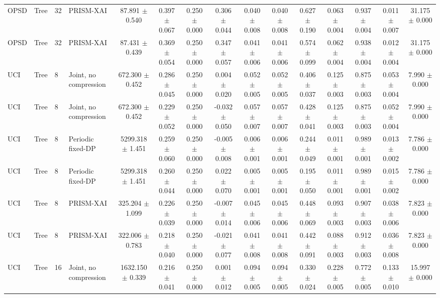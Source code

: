 \begin{table}[t]
\begin{tabular}{llllccccccccccc}
OPSD & Tree & 32 & PRISM-XAI & 87.891 $\pm$ 0.540 & 0.397 $\pm$ 0.067 & 0.250 $\pm$ 0.000 & 0.306 $\pm$ 0.044 & 0.040 $\pm$ 0.008 & 0.040 $\pm$ 0.008 & 0.627 $\pm$ 0.190 & 0.063 $\pm$ 0.004 & 0.937 $\pm$ 0.004 & 0.011 $\pm$ 0.007 & 31.175 $\pm$ 0.000 \\
OPSD & Tree & 32 & PRISM-XAI & 87.431 $\pm$ 0.439 & 0.369 $\pm$ 0.054 & 0.250 $\pm$ 0.000 & 0.347 $\pm$ 0.057 & 0.041 $\pm$ 0.006 & 0.041 $\pm$ 0.006 & 0.574 $\pm$ 0.099 & 0.062 $\pm$ 0.004 & 0.938 $\pm$ 0.004 & 0.012 $\pm$ 0.004 & 31.175 $\pm$ 0.000 \\
UCI & Tree & 8 & Joint, no compression & 672.300 $\pm$ 0.452 & 0.286 $\pm$ 0.045 & 0.250 $\pm$ 0.000 & 0.004 $\pm$ 0.020 & 0.052 $\pm$ 0.005 & 0.052 $\pm$ 0.005 & 0.406 $\pm$ 0.037 & 0.125 $\pm$ 0.003 & 0.875 $\pm$ 0.003 & 0.053 $\pm$ 0.004 & 7.990 $\pm$ 0.000 \\
UCI & Tree & 8 & Joint, no compression & 672.300 $\pm$ 0.452 & 0.229 $\pm$ 0.052 & 0.250 $\pm$ 0.000 & -0.032 $\pm$ 0.050 & 0.057 $\pm$ 0.007 & 0.057 $\pm$ 0.007 & 0.428 $\pm$ 0.041 & 0.125 $\pm$ 0.003 & 0.875 $\pm$ 0.003 & 0.052 $\pm$ 0.004 & 7.990 $\pm$ 0.000 \\
UCI & Tree & 8 & Periodic fixed-DP & 5299.318 $\pm$ 1.451 & 0.259 $\pm$ 0.060 & 0.250 $\pm$ 0.000 & -0.005 $\pm$ 0.008 & 0.006 $\pm$ 0.001 & 0.006 $\pm$ 0.001 & 0.244 $\pm$ 0.049 & 0.011 $\pm$ 0.001 & 0.989 $\pm$ 0.001 & 0.013 $\pm$ 0.002 & 7.786 $\pm$ 0.000 \\
UCI & Tree & 8 & Periodic fixed-DP & 5299.318 $\pm$ 1.451 & 0.260 $\pm$ 0.044 & 0.250 $\pm$ 0.000 & 0.022 $\pm$ 0.070 & 0.005 $\pm$ 0.001 & 0.005 $\pm$ 0.001 & 0.195 $\pm$ 0.050 & 0.011 $\pm$ 0.001 & 0.989 $\pm$ 0.001 & 0.015 $\pm$ 0.002 & 7.786 $\pm$ 0.000 \\
UCI & Tree & 8 & PRISM-XAI & 325.204 $\pm$ 1.099 & 0.226 $\pm$ 0.039 & 0.250 $\pm$ 0.000 & -0.007 $\pm$ 0.014 & 0.045 $\pm$ 0.006 & 0.045 $\pm$ 0.006 & 0.448 $\pm$ 0.069 & 0.093 $\pm$ 0.003 & 0.907 $\pm$ 0.003 & 0.038 $\pm$ 0.006 & 7.823 $\pm$ 0.000 \\
UCI & Tree & 8 & PRISM-XAI & 322.006 $\pm$ 0.783 & 0.218 $\pm$ 0.040 & 0.250 $\pm$ 0.000 & -0.021 $\pm$ 0.077 & 0.041 $\pm$ 0.008 & 0.041 $\pm$ 0.008 & 0.442 $\pm$ 0.091 & 0.088 $\pm$ 0.003 & 0.912 $\pm$ 0.003 & 0.036 $\pm$ 0.008 & 7.823 $\pm$ 0.000 \\
UCI & Tree & 16 & Joint, no compression & 1632.150 $\pm$ 0.339 & 0.216 $\pm$ 0.041 & 0.250 $\pm$ 0.000 & 0.001 $\pm$ 0.012 & 0.094 $\pm$ 0.005 & 0.094 $\pm$ 0.005 & 0.330 $\pm$ 0.024 & 0.228 $\pm$ 0.005 & 0.772 $\pm$ 0.005 & 0.133 $\pm$ 0.010 & 15.997 $\pm$ 0.000 \\

\end{tabular}
\end{table}
